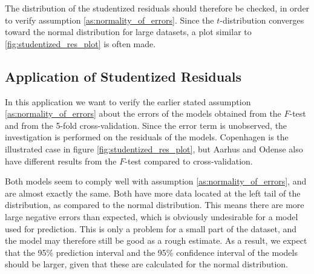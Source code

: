 The distribution of the studentized residuals should therefore be checked, in order to verify assumption \ref{as:normality_of_errors}. 
Since the $t$-distribution converges toward the normal distribution for large datasets, a plot similar to \ref{fig:studentized_res_plot} is often made.

\subsection{Application of Studentized Residuals} \label{sub:residuals}

In this application we want to verify the earlier stated assumption \ref{as:normality_of_errors} about the errors of the models obtained from the $F$-test and from the 5-fold cross-validation. 
Since the error term is unobserved, the investigation is performed on the residuals of the models.
Copenhagen is the illustrated case in figure \ref{fig:studentized_res_plot}, but Aarhus and Odense also have different results from the $F$-test compared to cross-validation.

Both models seem to comply well with assumption \ref{as:normality_of_errors}, and are almost exactly the same.
Both have more data located at the left tail of the distribution, as compared to the normal distribution. 
This means there are more large negative errors than expected, which is obviously undesirable for a model used for prediction. 
This is only a problem for a small part of the dataset, and the model may therefore still be good as a rough estimate. 
As a result, we expect that the 95\% prediction interval and the 95\% confidence interval of the models should be larger, given that these are calculated for the normal distribution.

